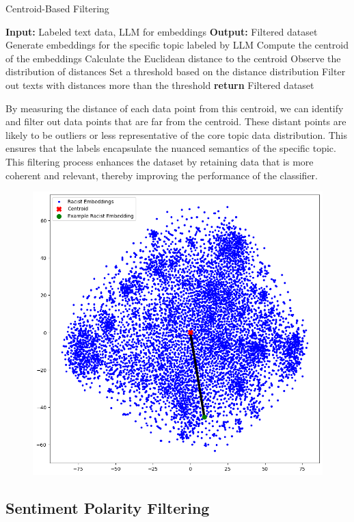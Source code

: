 \documentclass[preprint]{article}
\begin{document}
\begin{algorithm}[H]
  \caption{Centroid-Based Filtering}
  \label{alg:centroid_filtering}
  \begin{algorithmic}[1]
    \State \textbf{Input:} Labeled text data, LLM for embeddings
    \State \textbf{Output:} Filtered dataset
    \State Generate embeddings for the specific topic labeled by LLM
    \State Compute the centroid of the embeddings
    \State Calculate the Euclidean distance to the centroid
    \EndFor
    \State Observe the distribution of distances
    \State Set a threshold based on the distance distribution
    \State Filter out texts with distances more than the threshold
    \State \textbf{return} Filtered dataset
  \end{algorithmic}
\end{algorithm}


By measuring the distance of each data point from this centroid, we can identify and filter out data points that are far from the centroid. These distant points are likely to be outliers or less representative of the core topic data distribution. This ensures that the labels encapsulate the nuanced semantics of the specific topic. This filtering process enhances the dataset by retaining data that is more coherent and relevant, thereby improving the performance of the classifier.

\begin{figure}[h]
  \centering
  \includegraphics[width=0.6\linewidth]{img/centroid-distance.png}
\end{figure}

\subsection{Sentiment Polarity Filtering}
\end{document}
